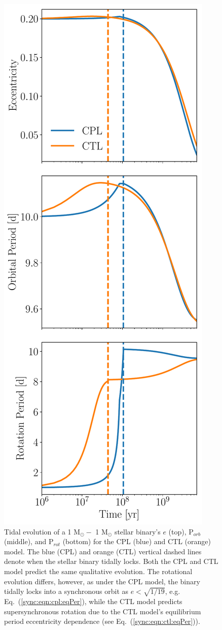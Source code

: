 \begin{figure}
	\includegraphics[scale=0.5]{tidalExample.pdf}
   \caption{Tidal evolution of a 1 M$_{\odot} -$ 1 M$_{\odot}$ stellar binary's $e$ (top), P$_{orb}$ (middle), and P$_{rot}$ (bottom) for the CPL (blue) and CTL (orange) model. The blue (CPL) and orange (CTL) vertical dashed lines denote when the stellar binary tidally locks. Both the CPL and CTL model predict the same qualitative evolution. The rotational evolution differs, however, as under the CPL model, the binary tidally locks into a synchronous orbit as $e < \sqrt{1/19}$, e.g. Eq.~(\ref{sync:eqn:cpl:eqPer}), while the CTL model predicts supersynchronous rotation due to the CTL model's equilibrium period eccentricity dependence (see Eq.~(\ref{sync:eqn:ctl:eqPer})).}%
    \label{sync:fig:tidalExample}%
\end{figure}

